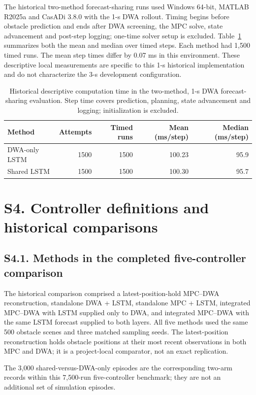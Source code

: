 \documentclass[10pt]{article}
\begin{document}
The historical two-method forecast-sharing runs used Windows 64-bit, MATLAB R2025a and CasADi 3.8.0 with the 1-s DWA rollout. Timing begins before obstacle prediction and ends after DWA screening, the MPC solve, state advancement and post-step logging; one-time solver setup is excluded. Table~\ref{tab:runtime} summarizes both the mean and median over timed steps. Each method had 1,500 timed runs. The mean step times differ by 0.07 ms in this environment. These descriptive local measurements are specific to this 1-s historical implementation and do not characterize the 3-s development configuration.

\begin{table}[ht]
\centering
\caption{Historical descriptive computation time in the two-method, 1-s DWA forecast-sharing evaluation. Step time covers prediction, planning, state advancement and logging; initialization is excluded.}
\label{tab:runtime}
\small
\renewcommand{\arraystretch}{1.12}
\begin{tabular}{@{}lrrrr@{}}
\toprule
Method & Attempts & Timed runs & Mean (ms/step) & Median (ms/step) \\
\midrule
DWA-only LSTM & 1500 & 1500 & 100.23 & 95.9 \\
Shared LSTM & 1500 & 1500 & 100.30 & 95.7 \\
\bottomrule
\end{tabular}
\end{table}

\section*{S4. Controller definitions and historical comparisons}
\subsection*{S4.1. Methods in the completed five-controller comparison}
The historical comparison comprised a latest-position-hold MPC--DWA reconstruction, standalone DWA + LSTM, standalone MPC + LSTM, integrated MPC--DWA with LSTM supplied only to DWA, and integrated MPC--DWA with the same LSTM forecast supplied to both layers. All five methods used the same 500 obstacle scenes and three matched sampling seeds. The latest-position reconstruction holds obstacle positions at their most recent observations in both MPC and DWA; it is a project-local comparator, not an exact replication.

The 3,000 shared-versus-DWA-only episodes are the corresponding two-arm records within this 7,500-run five-controller benchmark; they are not an additional set of simulation episodes.
\end{document}

